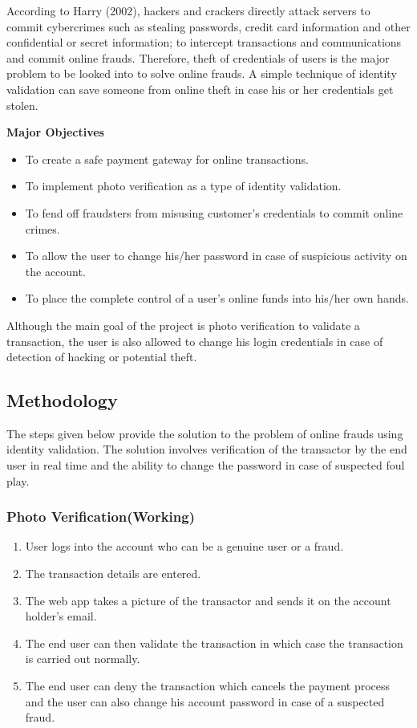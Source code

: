 \documentclass[12pt, oneside, a4paper]{article}
\begin{document}
According to Harry (2002), hackers and crackers directly attack servers to commit cybercrimes such as stealing passwords, credit card information and other confidential or secret information; to intercept transactions and communications and commit online frauds\cite{Project_Objective}. Therefore, theft of credentials of users is the major problem to be looked into to solve online frauds. A simple technique of identity validation can save someone from online theft in case his or her credentials get stolen.

\vspace{1cm}
\textbf{Major Objectives}
\begin{itemize}
    \item To create a safe payment gateway for online transactions.
    \item To implement photo verification as a type of identity validation.
    \item To fend off fraudsters from misusing customer's credentials to commit online crimes.
    \item To allow the user to change his/her password in case of suspicious activity on the account.
    \item To place the complete control of a user's online funds into his/her own hands.
\end{itemize}

\vspace{1cm}
Although the main goal of the project is photo verification to validate a transaction, the user is also allowed to change his login credentials in case of detection of hacking or potential theft.

\pagebreak

\subsection{Methodology}
The steps given below provide the solution to the problem of online frauds using identity validation. The solution involves verification of the transactor by the end user in real time and the ability to change the password in case of suspected foul play.
\subsubsection{Photo Verification(Working)}
\begin{enumerate}
    \itemsep0em
    \item User logs into the account who can be a genuine user or a fraud.
    \item The transaction details are entered.
    \item The web app takes a picture of the transactor and sends it on the account holder's email.
    \item The end user can then validate the transaction in which case the transaction is carried out normally.
    \item The end user can deny the transaction which cancels the payment process and the user can also change his account password in case of a suspected fraud.
\end{enumerate}
\end{document}
